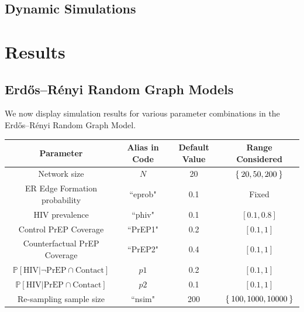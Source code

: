 \documentclass{article}
\theoremstyle{definition}
\begin{document}

\subsection{Dynamic Simulations}

\section{Results}
\subsection{Erdős–Rényi  Random Graph Models}
We now display simulation results for various parameter combinations in the Erdős–Rényi Random Graph Model.
\begin{center}
    \begin{tabular}{|c|c|c|c|}
    \hline
         \bf Parameter & Alias in Code &  Default Value & Range Considered  \\
         \hline
         Network size & $N$& 20 & $\Set{20,50,200}$\\
         \hline
         ER Edge Formation probability & ``eprob" & 0.1 & Fixed \\
         \hline
         HIV prevalence & ``phiv" & 0.1 & $[0.1,0.8]$\\
         \hline
         Control PrEP Coverage &  ``PrEP1" & 0.2 & $[0.1,1]$\\
         \hline
         Counterfactual PrEP Coverage & ``PrEP2" & 0.4 & $[0.1,1]$\\
         \hline
         $\mathbb{P}\left[\text{HIV} \vert \neg \text{PrEP} \cap \text{Contact}\right]$ & $p1$ & 0.2 & $[0.1,1]$\\
         \hline
         $\mathbb{P}\left[\text{HIV} \vert \text{PrEP} \cap \text{Contact}\right]$ & $p2$  & 0.1 & $[0.1,1]$\\
         \hline
         Re-sampling sample size & ``nsim" & 200 & $\Set{100,1000,10000}$\\
         \hline
    \end{tabular}
\end{center}
\end{document}
